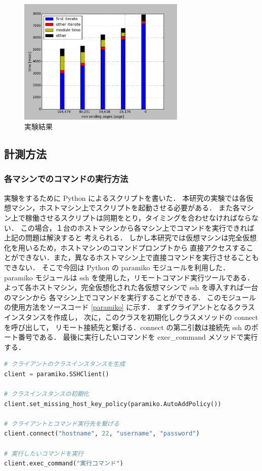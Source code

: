 \documentclass[graduation-thesis]{mlarticle}
\begin{document}
\begin{figure}[H]\begin{center}\includegraphics[width=8.0cm]{./img/exp_result.png}\caption{ 実験結果}\label{exp_result}\end{center}\end{figure}

\clearpage
\subsection{計測方法}
\label{sec-6-2}
\subsubsection{各マシンでのコマンドの実行方法}
\label{sec-6-2-1}
実験をするために Python によるスクリプトを書いた．
本研究の実験では各仮想マシン，ホストマシン上でスクリプトを起動させる必要がある．
また各マシン上で稼働させるスクリプトは同期をとり，タイミングを合わせなければならない．
この場合，１台のホストマシンから各マシン上でコマンドを実行できれば上記の問題は解決すると
考えられる．
しかし本研究では仮想マシンは完全仮想化を用いるため，ホストマシンのコマンドプロンプトから
直接アクセスすることができない．また，異なるホストマシン上で直接コマンドを実行させることもできない．
そこで今回は Python の paramiko モジュールを利用した．
paramiko モジュールは ssh を使用した，リモートコマンド実行ツールである．
よって各ホストマシン，完全仮想化された各仮想マシンで ssh を導入すれば一台のマシンから
各マシン上でコマンドを実行することができる．
このモジュールの使用方法をソースコード \ref{paramiko} に示す．
まずクライアントとなるクラスインスタンスを作成し，
次に，このクラスを初期化しクラスメソッドの connect を呼び出して，
リモート接続先と繋げる．connect の第二引数は接続先 ssh のポート番号である．
最後に実行したいコマンドを exec\_command メソッドで実行する．
\begin{lstlisting}[language=Python, caption=paramikoの使用法, label=paramiko]
# クライアントのクラスインスタンスを生成
client = paramiko.SSHClient()

# クラスインスタンスの初期化
client.set_missing_host_key_policy(paramiko.AutoAddPolicy())

# クライアントとコマンド実行先を繋げる
client.connect("hostname", 22, "username", "password")

# 実行したいコマンドを実行
client.exec_command("実行コマンド")
                         
\end{lstlisting}
\ \newline
\end{document}
